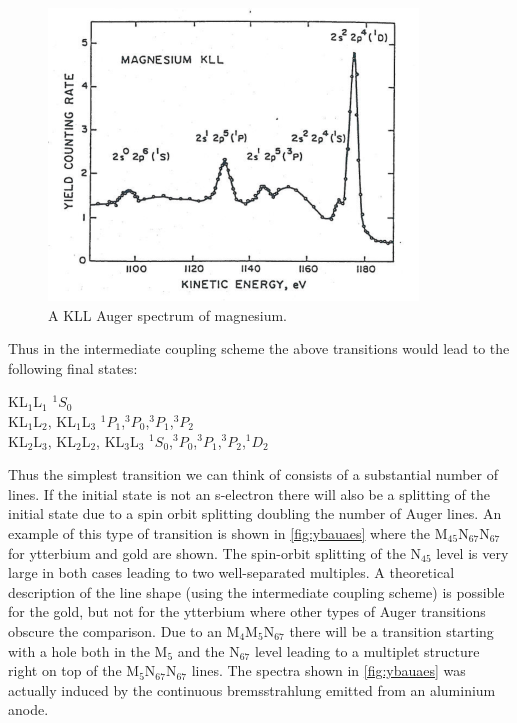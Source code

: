 \begin{figure}[h!]
	\begin{center}
	\includegraphics[scale=4]{figures/06_04.png}
	\caption{A KLL Auger spectrum of magnesium.}
	\label{fig:mgaes}
	\end{center}
\end{figure}

Thus in the intermediate coupling scheme the above transitions would lead to the following final states:

             \vspace{0.5cm}

          \noindent     KL$_1$L$_1$      \hfill      $^1S_0$\\
          KL$_1$L$_2$,           KL$_1$L$_3$            \hfill
          $^1P_1$,$^3P_0$,$^3P_1$,$^3P_2$\\
          KL$_2$L$_3$, KL$_2$L$_2$,  KL$_3$L$_3$   \hfill
          $^1S_0$,$^3P_0$,$^3P_1$,$^3P_2$,$^1D_2$\\

          \vspace{0.5cm}

Thus the simplest transition we can think of consists of a substantial number of lines. If the initial state is not an s-electron there will also be a splitting of the initial state due to a spin orbit splitting doubling the number of Auger lines. An example of this type of transition is shown in \autoref{fig:ybauaes} where the M$_{45}$N$_{67}$N$_{67}$ for ytterbium and gold are shown. The spin-orbit splitting of the N$_{45}$ level is very large in both cases leading to two well-separated multiples. A theoretical description of the line shape (using the intermediate coupling  scheme) is possible for the gold, but not for the ytterbium where other types of Auger transitions obscure the comparison. Due to an M$_{4}$M$_{5}$N$_{67}$ there will be a transition starting with a hole both in the M$_{5}$ and the N$_{67}$ level leading to a multiplet structure right on top of the M$_{5}$N$_{67}$N$_{67}$ lines. The spectra shown in \autoref{fig:ybauaes} was actually induced by the continuous bremsstrahlung emitted from an aluminium anode.

